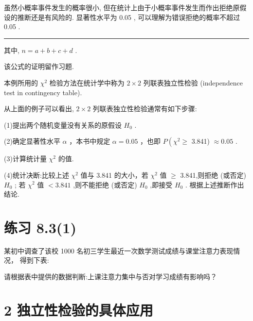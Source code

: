 \documentclass[10pt]{article}
\newcommand{\HRule}{\begin{center}\rule{0.9\linewidth}{0.2mm}\end{center}}
\begin{document}
虽然小概率事件发生的概率很小, 但在统计上由于小概率事件发生而作出拒绝原假设的推断还是有风险的. 显著性水平为 0.05 , 可以理解为错误拒绝的概率不超过0.05 .

\HRule

其中, \(n = a + b + c + d\) .

该公式的证明留作习题.

本例所用的 \({\chi }^{2}\) 检验方法在统计学中称为 \(2 \times  2\) 列联表独立性检验 (independence test in contingency table).

从上面的例子可以看出, \(2 \times  2\) 列联表独立性检验通常有如下步骤:

(1)提出两个随机变量没有关系的原假设 \({H}_{0}\) .

(2)确定显著性水平 \(\alpha\) ，本书中规定 \(\alpha  = {0.05}\) ，也即 \(P\left( {{\chi }^{2} \geq  }\right.\) 3.841) \(\approx  {0.05}\) .

(3)计算统计量 \({\chi }^{2}\) 的值.

(4)统计决断:比较上述 \({\chi }^{2}\) 值与 3.841 的大小，若 \({\chi }^{2}\) 值 \(\geq\) 3.841,则拒绝 (或否定) \({H}_{0}\) ; 若 \({\chi }^{2}\) 值 \(< {3.841}\) ,则不能拒绝 (或否定) \({H}_{0}\) ,即接受 \({H}_{0}\) . 根据上述推断作出结论.

\section*{练习 8.3(1)}

某初中调查了该校 1000 名初三学生最近一次数学测试成绩与课堂注意力表现情况， 得到下表:

\begin{center}
\end{center}

请根据表中提供的数据判断:上课注意力集中与否对学习成绩有影响吗？

\section*{2 独立性检验的具体应用}
\end{document}
